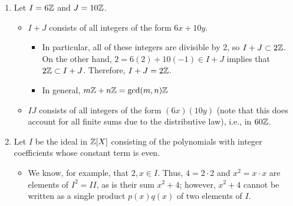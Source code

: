 \documentclass[../notes.tex]{subfiles}
\begin{document}
\begin{itemize}
\begin{enumerate}
        \item Let $I=6\mathbb{Z}$ and $J=10\mathbb{Z}$.
        \begin{itemize}
            \item $I+J$ consists of all integers of the form $6x+10y$.
            \begin{itemize}
                \item In particular, all of these integers are divisible by 2, so $I+J\subset 2\mathbb{Z}$. On the other hand, $2=6(2)+10(-1)\in I+J$ implies that $2\mathbb{Z}\subset I+J$. Therefore, $I+J=2\mathbb{Z}$.
                \item In general, $m\mathbb{Z}+n\mathbb{Z}=\gcd(m,n)\mathbb{Z}$
            \end{itemize}
            \item $IJ$ consists of all integers of the form $(6x)(10y)$ (note that this does account for all finite sums due to the distributive law), i.e., in $60\mathbb{Z}$.
        \end{itemize}
        \item Let $I$ be the ideal in $\mathbb{Z}[X]$ consisting of the polynomials with integer coefficients whose constant term is even.
        \begin{itemize}
            \item We know, for example, that $2,x\in I$. Thus, $4=2\cdot 2$ and $x^2=x\cdot x$ are elements of $I^2=II$, as is their sum $x^2+4$; however, $x^2+4$ cannot be written as a single product $p(x)q(x)$ of two elements of $I$.
        \end{itemize}
    \end{enumerate}
\end{itemize}
\end{document}
